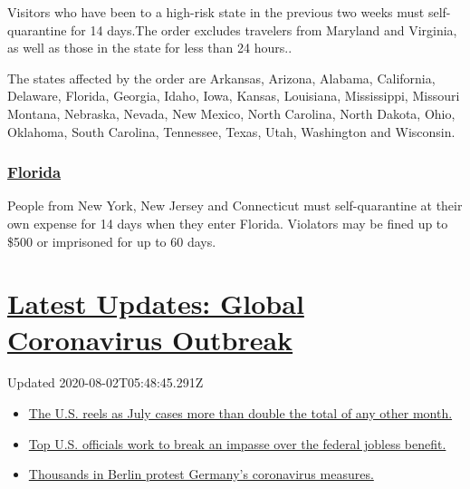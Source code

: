 Visitors who have been to a high-risk state in the previous two weeks
must self-quarantine for 14 days.The order excludes travelers from
Maryland and Virginia, as well as those in the state for less than 24
hours..

The states affected by the order are Arkansas, Arizona, Alabama,
California, Delaware, Florida, Georgia, Idaho, Iowa, Kansas, Louisiana,
Mississippi, Missouri Montana, Nebraska, Nevada, New Mexico, North
Carolina, North Dakota, Ohio, Oklahoma, South Carolina, Tennessee,
Texas, Utah, Washington and Wisconsin.

\hypertarget{florida}{%
\subsubsection{\texorpdfstring{\href{https://floridahealthcovid19.gov/travelers/}{Florida}}{Florida}}\label{florida}}

People from New York, New Jersey and Connecticut must self-quarantine at
their own expense for 14 days when they enter Florida. Violators may be
fined up to \$500 or imprisoned for up to 60 days.

\hypertarget{latest-updates-global-coronavirus-outbreak}{%
\section{\texorpdfstring{\href{https://www.nytimes.com/2020/08/01/world/coronavirus-covid-19.html?action=click\&pgtype=Article\&state=default\&region=MAIN_CONTENT_1\&context=storylines_live_updates}{Latest
Updates: Global Coronavirus
Outbreak}}{Latest Updates: Global Coronavirus Outbreak}}\label{latest-updates-global-coronavirus-outbreak}}

Updated 2020-08-02T05:48:45.291Z

\begin{itemize}
\tightlist
\item
  \href{https://www.nytimes.com/2020/08/01/world/coronavirus-covid-19.html?action=click\&pgtype=Article\&state=default\&region=MAIN_CONTENT_1\&context=storylines_live_updates\#link-34047410}{The
  U.S. reels as July cases more than double the total of any other
  month.}
\item
  \href{https://www.nytimes.com/2020/08/01/world/coronavirus-covid-19.html?action=click\&pgtype=Article\&state=default\&region=MAIN_CONTENT_1\&context=storylines_live_updates\#link-780ec966}{Top
  U.S. officials work to break an impasse over the federal jobless
  benefit.}
\item
  \href{https://www.nytimes.com/2020/08/01/world/coronavirus-covid-19.html?action=click\&pgtype=Article\&state=default\&region=MAIN_CONTENT_1\&context=storylines_live_updates\#link-25930521}{Thousands
  in Berlin protest Germany's coronavirus measures.}
\end{itemize}

